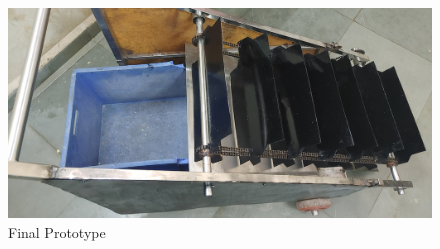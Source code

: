 \pagebreak

\begin{figure}[H]
    \centering
    \includegraphics[scale=0.1]{with bucket 2.jpg}
    \caption{Final Prototype}
    \label{fig:prototype}
\end{figure}
